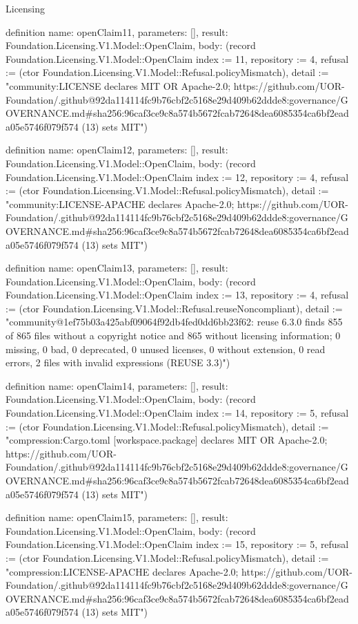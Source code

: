\begin{lexlean}{Licensing}
\begin{semanticmodule}
definition{
  name: openClaim11,
  parameters: [],
  result: Foundation.Licensing.V1.Model::OpenClaim,
  body: (record Foundation.Licensing.V1.Model::OpenClaim {index := 11, repository := 4, refusal := (ctor Foundation.Licensing.V1.Model::Refusal.policyMismatch), detail := "community:LICENSE declares MIT OR Apache-2.0; https://github.com/UOR-Foundation/.github@92da114114fc9b76cbf2c5168e29d409b62ddde8:governance/GOVERNANCE.md#sha256:96caf3ce9c8a574b5672fcab72648dea6085354ca6bf2eada05e5746f079f574 (13) sets MIT"})
}

definition{
  name: openClaim12,
  parameters: [],
  result: Foundation.Licensing.V1.Model::OpenClaim,
  body: (record Foundation.Licensing.V1.Model::OpenClaim {index := 12, repository := 4, refusal := (ctor Foundation.Licensing.V1.Model::Refusal.policyMismatch), detail := "community:LICENSE-APACHE declares Apache-2.0; https://github.com/UOR-Foundation/.github@92da114114fc9b76cbf2c5168e29d409b62ddde8:governance/GOVERNANCE.md#sha256:96caf3ce9c8a574b5672fcab72648dea6085354ca6bf2eada05e5746f079f574 (13) sets MIT"})
}

definition{
  name: openClaim13,
  parameters: [],
  result: Foundation.Licensing.V1.Model::OpenClaim,
  body: (record Foundation.Licensing.V1.Model::OpenClaim {index := 13, repository := 4, refusal := (ctor Foundation.Licensing.V1.Model::Refusal.reuseNoncompliant), detail := "community@1ef75b03a425abf09064f92db4fed0dd6bb23f62: reuse 6.3.0 finds 855 of 865 files without a copyright notice and 865 without licensing information; 0 missing, 0 bad, 0 deprecated, 0 unused licenses, 0 without extension, 0 read errors, 2 files with invalid expressions (REUSE 3.3)"})
}

definition{
  name: openClaim14,
  parameters: [],
  result: Foundation.Licensing.V1.Model::OpenClaim,
  body: (record Foundation.Licensing.V1.Model::OpenClaim {index := 14, repository := 5, refusal := (ctor Foundation.Licensing.V1.Model::Refusal.policyMismatch), detail := "compression:Cargo.toml [workspace.package] declares MIT OR Apache-2.0; https://github.com/UOR-Foundation/.github@92da114114fc9b76cbf2c5168e29d409b62ddde8:governance/GOVERNANCE.md#sha256:96caf3ce9c8a574b5672fcab72648dea6085354ca6bf2eada05e5746f079f574 (13) sets MIT"})
}

definition{
  name: openClaim15,
  parameters: [],
  result: Foundation.Licensing.V1.Model::OpenClaim,
  body: (record Foundation.Licensing.V1.Model::OpenClaim {index := 15, repository := 5, refusal := (ctor Foundation.Licensing.V1.Model::Refusal.policyMismatch), detail := "compression:LICENSE-APACHE declares Apache-2.0; https://github.com/UOR-Foundation/.github@92da114114fc9b76cbf2c5168e29d409b62ddde8:governance/GOVERNANCE.md#sha256:96caf3ce9c8a574b5672fcab72648dea6085354ca6bf2eada05e5746f079f574 (13) sets MIT"})
}


\end{semanticmodule}
\end{lexlean}
